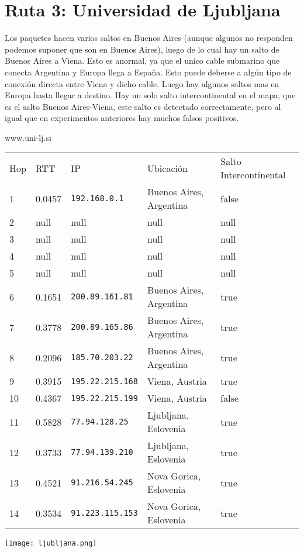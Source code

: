 \section{Ruta 3: Universidad de Ljubljana}
Los paquetes hacen varios saltos en Buenos Aires (aunque algunos no responden podemos suponer que son en Buenos Aires), luego de lo cual hay un salto de Buenos Aires a Viena. Esto es anormal, ya que el unico cable submarino que conecta Argentina y Europa llega a España. Esto puede deberse a algún tipo de conexión directa entre Viena y dicho cable. Luego hay algunos saltos mas en Europa hasta llegar a destino. Hay un solo salto intercontinental en el mapa, que es el salto Buenos Aires-Viena, este salto es detectado correctamente, pero al igual que en experimentos anteriores hay muchos falsos positivos.


www.uni-lj.si

\begin{tabular}{l | l | l | l | l}
Hop & RTT & IP & Ubicación & Salto Intercontinental\\
1 & 0.0457 & \texttt{192.168.0.1} & Buenos Aires, Argentina & false\\
2 & null & null & null & null\\
3 & null & null & null & null\\
4 & null & null & null & null\\
5 & null & null & null & null\\
6 & 0.1651 & \texttt{200.89.161.81} & Buenos Aires, Argentina & true\\
7 & 0.3778 & \texttt{200.89.165.86} & Buenos Aires, Argentina & true\\
8 & 0.2096 & \texttt{185.70.203.22} & Buenos Aires, Argentina & true\\
9 & 0.3915 & \texttt{195.22.215.168} & Viena, Austria & true\\
10 & 0.4367 & \texttt{195.22.215.199} & Viena, Austria & false\\
11 & 0.5828 & \texttt{77.94.128.25} & Ljubljana, Eslovenia & true\\
12 & 0.3733 & \texttt{77.94.139.210} & Ljubljana, Eslovenia & true\\
13 & 0.4521 & \texttt{91.216.54.245} & Nova Gorica, Eslovenia & true\\
14 & 0.3534 & \texttt{91.223.115.153} & Nova Gorica, Eslovenia & true\\
\end{tabular}

\texttt{[image: ljubljana.png]}